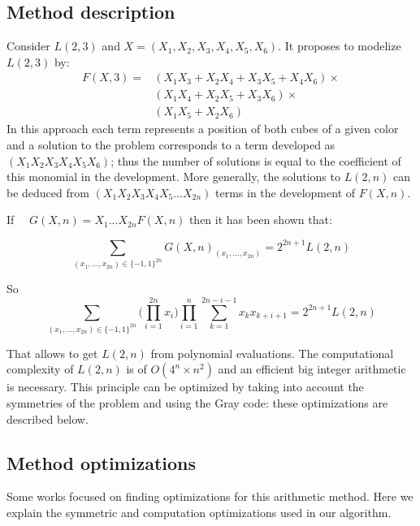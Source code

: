 \subsection{Method description}
Consider $L(2,3)$ and $X=(X_1,X_2,X_3,X_4,X_5,X_6)$. 
It proposes to modelize $L(2,3)$ by: 
\begin{equation}
\begin{aligned}
F(X,3) = & (X_1X_3+X_2X_4+X_3X_5+X_4X_6)\times \\
& (X_1X_4+X_2X_5+X_3X_6)\times\\
& (X_1X_5+X_2X_6)
\end{aligned}
\end{equation}
In this approach each term represents a position of both cubes of a given color and a solution to the problem corresponds to a term developed as $(X_1X_2X_3X_4X_5X_6)$; thus the number of solutions is equal to the coefficient of this monomial in the development. 
More generally, the solutions to $L(2,n)$ can be deduced from $(X_1X_2X_3X_4X_5...X_{2n})$ terms in the development of $F(X,n)$.

If \ \ $G(X,n) = X_1 ... X_{2n} F(X,n)$ then it has been shown that: 

\begin{equation}
\sum\limits_{(x_1,...,x_{2n}) \in \{-1,1\}^{2n}} G(X,n)_{(x_1,...,x_{2n})} =  2^{2n+1}L(2,n)
\end{equation}

So \hspace*{2cm}
\begin{equation}
\sum\limits_{(x_1,...,x_{2n}) \in \{-1,1\}^{2n}} \big( \prod\limits_{i=1}^{2n} x_i \big) \prod\limits_{i=1}^{n} \sum\limits_{k=1}^{2n-i-1} x_kx_{k+i+1} = 2^{2n+1} L(2,n)
\end{equation}

\noindent That allows to get $L(2,n)$ from polynomial evaluations.
The computational complexity of $L(2,n)$ is of $O(4^n\times n^2)$ and an efficient big integer arithmetic is necessary. 
This principle can be optimized by taking into account the symmetries of the problem and using the Gray code: these optimizations are described below.

\subsection{Method optimizations}
Some works focused on finding optimizations for this arithmetic method\cite{CReSTIC-1154}. 
Here we explain the symmetric and computation optimizations used in our algorithm.

